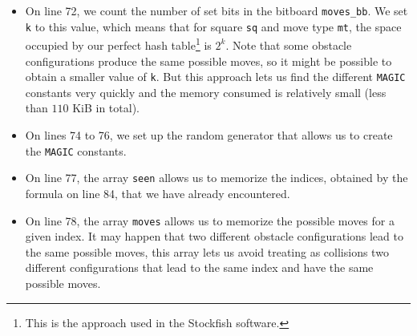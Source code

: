 \documentclass[12pt,a4paper,twoside,openright]{book}
\begin{document}
\begin{itemize}
\begin{itemize}
\item On line 72, we count the number of set bits in the bitboard \texttt{moves_bb}. We set \texttt{k} to this value, which means that for square \texttt{sq} and move type \texttt{mt}, the space occupied by our perfect hash table\footnote{This is the approach used in the Stockfish software\cite{stockfish2025}.} is $2^k$. Note that some obstacle configurations produce the same possible moves, so it might be possible to obtain a smaller value of \texttt{k}. But this approach lets us find the different \texttt{MAGIC} constants very quickly and the memory consumed is relatively small (less than $110$ KiB in total).

\item On lines 74 to 76, we set up the random generator that allows us to create the \texttt{MAGIC} constants.

\item On line 77, the array \texttt{seen} allows us to memorize the indices, obtained by the formula on line 84, that we have already encountered.

\item On line 78, the array \texttt{moves} allows us to memorize the possible moves for a given index. It may happen that two different obstacle configurations lead to the same possible moves, this array lets us avoid treating as collisions two different configurations that lead to the same index and have the same possible moves.


\end{itemize}
\end{itemize}
\end{document}
